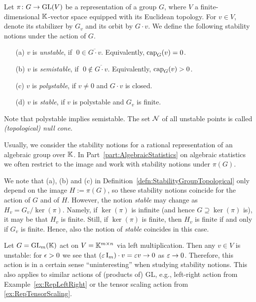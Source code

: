 \begin{defn}\label{defn:StabilityGroupTopological}
	Let $\pi \colon G \to \operatorname{GL}(V)$ be a representation of a group $G$, where $V$ a finite-dimensional $\mathbb K$-vector space equipped with its Euclidean topology. For $v \in V$, denote its stabilizer by $G_v$ and its orbit by $G \cdot v$. We define the following stability notions under the action of $G$.
	\begin{itemize}
		\item[(a)] $v$ is \emph{unstable}, if $\;0 \in \overline{G \cdot v}$. Equivalently, $\operatorname{cap}_G(v) = 0$.
		
		\item[(b)] $v$ is \emph{semistable}, if $\;0 \notin \overline{G \cdot v}$. Equivalently, $\operatorname{cap}_G(v) > 0$.
		
		\item[(c)] $v$ is \emph{polystable}, if $v \neq 0$ and $G \cdot v$ is closed.
		
		\item[(d)] $v$ is \emph{stable}, if $v$ is polystable and $G_v$ is finite.
	\end{itemize}
	Note that polystable implies semistable.
	The set $\mathcal{N}$ of all unstable points is called \emph{(topological) null cone}.
	\hfill{}
\end{defn}

Usually, we consider the stability notions for a rational representation of an algebraic group over $\mathbb K$. In Part~\ref{part:AlgebraicStatistics} on algebraic statistics we often restrict to the image and work with stability notions under $\pi(G)$.

\begin{remark}\label{rem:StabilityGroupVsImageUnderRep}
	We note that (a), (b) and (c) in Definition~\ref{defn:StabilityGroupTopological} only depend on the image $H := \pi(G)$, so these stability notions coincide for the action of $G$ and of $H$. However, the notion \emph{stable} may change as $H_v = G_v / \ker(\pi)$. Namely, if $\ker(\pi)$ is infinite (and hence $G \supseteq \ker(\pi)$ is), it may be that $H_v$ is finite. Still, if $\ker(\pi)$ is finite, then $H_v$ is finite if and only if $G_v$ is finite. Hence, also the notion of \emph{stable} coincides in this case.
	\hfill\remSymbol
\end{remark}

\begin{example}\label{ex:GLisUninteresting}
	Let $G = \operatorname{GL}_m(\mathbb K)$ act on $V = \mathbb K^{m \times n}$ via left multiplication. Then any $v \in V$ is unstable: for $\epsilon > 0$ we see that $(\varepsilon \operatorname{I}_m) \cdot v = \varepsilon v \to 0$ as $\varepsilon \to 0$. Therefore, this action is in a certain sense ``uninteresting'' when studying stability notions. This also applies to similar actions of (products of) GL, e.g., left-right action from Example~\ref{ex:RepLeftRight} or the tensor scaling action from \ref{ex:RepTensorScaling}.
	\hfill\exSymbol
\end{example}

